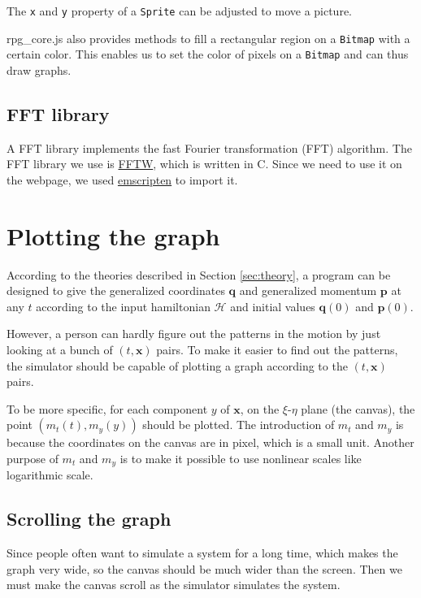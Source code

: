 \documentclass[12pt]{article}
\begin{document}
The \texttt{x} and \texttt{y} property of a \texttt{Sprite} can be adjusted to move a picture.

rpg\_core.js also provides methods to fill a rectangular region on a \texttt{Bitmap}
with a certain color.
This enables us to set the color of pixels on a \texttt{Bitmap} and can thus draw graphs.

\subsection{FFT library}
\label{sec:fft}

A FFT library implements the fast Fourier transformation (FFT) algorithm.
The FFT library we use is \href{http://www.fftw.org}{FFTW}, which is written in C.
Since we need to use it on the webpage,
we used \href{https://emscripten.org}{emscripten} to import it.

\section{Plotting the graph}

According to the theories described in Section \ref{sec:theory},
a program can be designed to give
the generalized coordinates $\mathbf q$ and generalized momentum $\mathbf p$ at any $t$
according to the input hamiltonian $\mathcal H$
and initial values $\mathbf q\left(0\right)$ and $\mathbf p\left(0\right)$.

However, a person can hardly figure out the patterns in the motion
by just looking at a bunch of $\left(t,\mathbf x\right)$ pairs.
To make it easier to find out the patterns,
the simulator should be capable of plotting a graph
according to the $\left(t,\mathbf x\right)$ pairs.

To be more specific, for each component $y$ of $\mathbf x$,
on the $\xi$-$\eta$ plane (the canvas),
the point $\left(m_t\left(t\right),m_y\left(y\right)\right)$ should be plotted.
The introduction of $m_t$ and $m_y$ is because the coordinates on the canvas
are in pixel, which is a small unit.
Another purpose of $m_t$ and $m_y$ is to make it possible to use nonlinear
scales like logarithmic scale.

\subsection{Scrolling the graph}

Since people often want to simulate a system for a long time,
which makes the graph very wide,
so the canvas should be much wider than the screen.
Then we must make the canvas scroll as the simulator simulates the system.
\end{document}
